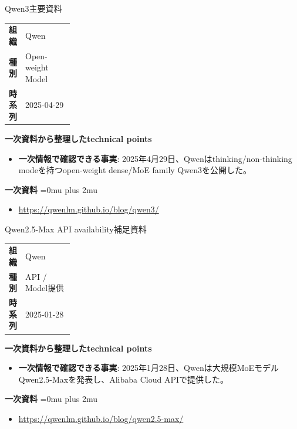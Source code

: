 \begin{technicalnote}{Qwen3}{主要資料}
\begingroup
\begin{tabularx}{\linewidth}{@{}>{\bfseries}p{0.22\linewidth}X@{}}
組織 & Qwen \\
種別 & Open-weight Model \\
時系列 & 2025-04-29 \\
\end{tabularx}
\smallskip
{\bfseries 一次資料から整理したtechnical points}
\begin{itemize}[leftmargin=1.5em,itemsep=0.35em]
\item \textbf{一次情報で確認できる事実}: 2025年4月29日、Qwenはthinking/non-thinking modeを持つopen-weight dense/MoE family Qwen3を公開した。
\end{itemize}
\begin{samepage}
{\bfseries 一次資料}
\begingroup\sloppy
\Urlmuskip=0mu plus 2mu\relax
\begin{itemize}[leftmargin=1.5em,itemsep=0.25em]
\item {\scriptsize\url{https://qwenlm.github.io/blog/qwen3/}}
\end{itemize}
\endgroup
\end{samepage}
\endgroup
\end{technicalnote}
\medskip

\begin{technicalnote}{Qwen2.5-Max API availability}{補足資料}
\begingroup
\begin{tabularx}{\linewidth}{@{}>{\bfseries}p{0.22\linewidth}X@{}}
組織 & Qwen \\
種別 & API / Model提供 \\
時系列 & 2025-01-28 \\
\end{tabularx}
\smallskip
{\bfseries 一次資料から整理したtechnical points}
\begin{itemize}[leftmargin=1.5em,itemsep=0.35em]
\item \textbf{一次情報で確認できる事実}: 2025年1月28日、Qwenは大規模MoEモデルQwen2.5-Maxを発表し、Alibaba Cloud APIで提供した。
\end{itemize}
\begin{samepage}
{\bfseries 一次資料}
\begingroup\sloppy
\Urlmuskip=0mu plus 2mu\relax
\begin{itemize}[leftmargin=1.5em,itemsep=0.25em]
\item {\scriptsize\url{https://qwenlm.github.io/blog/qwen2.5-max/}}
\end{itemize}
\endgroup
\end{samepage}
\endgroup
\end{technicalnote}
\medskip

